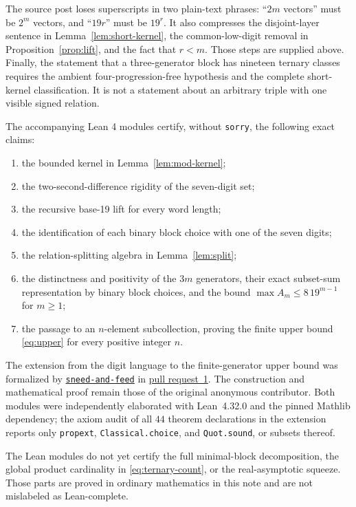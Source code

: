\documentclass[11pt]{article}
\theoremstyle{remark}
\begin{document}
The source post loses superscripts in two plain-text phrases: ``$2m$ vectors''
must be $2^m$ vectors, and ``$19r$'' must be $19^r$.  It also compresses the
disjoint-layer sentence in Lemma~\ref{lem:short-kernel}, the common-low-digit
removal in Proposition~\ref{prop:lift}, and the fact that $r<m$.  Those steps
are supplied above.  Finally, the statement that a three-generator block has
nineteen ternary classes requires the ambient four-progression-free hypothesis
and the complete short-kernel classification.  It is not a statement about an
arbitrary triple with one visible signed relation.

The accompanying Lean 4 modules certify, without \texttt{sorry}, the following exact
claims:
\begin{enumerate}[label=(\roman*)]
  \item the bounded kernel in Lemma~\ref{lem:mod-kernel};
  \item the two-second-difference rigidity of the seven-digit set;
  \item the recursive base-19 lift for every word length;
  \item the identification of each binary block choice with one of the seven
        digits;
  \item the relation-splitting algebra in Lemma~\ref{lem:split};
  \item the distinctness and positivity of the $3m$ generators, their exact
        subset-sum representation by binary block choices, and the bound
        $\max A_m\le8\,19^{m-1}$ for $m\ge1$;
  \item the passage to an $n$-element subcollection, proving the finite upper
        bound \eqref{eq:upper} for every positive integer $n$.
\end{enumerate}
The extension from the digit language to the finite-generator upper bound was
formalized by \href{https://github.com/sneed-and-feed}{\texttt{sneed-and-feed}}
in \href{https://github.com/KokunoYumeto/erdos-problem-817-workbench/pull/1}{pull request~1}.
The construction and mathematical proof remain those of the original
anonymous contributor.  Both modules were independently elaborated with
Lean~4.32.0 and the pinned Mathlib dependency; the axiom audit of all $44$
theorem declarations in the extension reports only \texttt{propext},
\texttt{Classical.choice}, and \texttt{Quot.sound}, or subsets thereof.

The Lean modules do not yet certify the full minimal-block decomposition, the
global product cardinality in \eqref{eq:ternary-count}, or the real-asymptotic
squeeze.  Those parts are proved in ordinary mathematics in this note and are
not mislabeled as Lean-complete.
\end{document}
